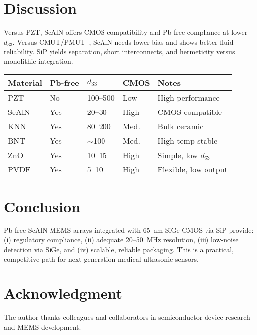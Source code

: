 \documentclass[conference]{IEEEtran}
\begin{document}
\section{Discussion}
Versus PZT, ScAlN offers CMOS compatibility and Pb-free compliance at lower $d_{33}$. Versus CMUT/PMUT~\cite{khuri2009cmut}, ScAlN needs lower bias and shows better fluid reliability. SiP yields separation, short interconnects, and hermeticity versus monolithic integration.

\begin{minipage}{\columnwidth}
\centering
{}
\label{tab:mat}
\begin{tabular}{@{}lllll@{}}
\toprule
Material & Pb-free & $d_{33}$ & CMOS & Notes\\
\midrule
PZT  & No  & 100--500 & Low  & High performance\\
ScAlN& Yes & 20--30   & High & CMOS-compatible\\
KNN  & Yes & 80--200  & Med. & Bulk ceramic\\
BNT  & Yes & $\sim$100& Med. & High-temp stable\\
ZnO  & Yes & 10--15   & High & Simple, low $d_{33}$\\
PVDF & Yes & 5--10    & High & Flexible, low output\\
\bottomrule
\end{tabular}
\end{minipage}

\section{Conclusion}
Pb-free ScAlN MEMS arrays integrated with 65~nm SiGe CMOS via SiP provide: (i) regulatory compliance, (ii) adequate 20--50~MHz resolution, (iii) low-noise detection via SiGe, and (iv) scalable, reliable packaging. This is a practical, competitive path for next-generation medical ultrasonic sensors.

\section*{Acknowledgment}
The author thanks colleagues and collaborators in semiconductor device research and MEMS development.



\end{document}
